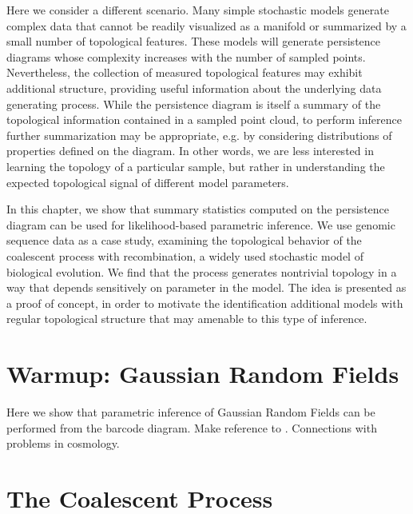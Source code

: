 Here we consider a different scenario.
Many simple stochastic models generate complex data that cannot be readily visualized as a manifold or summarized by a small number of topological features.
These models will generate persistence diagrams whose complexity increases with the number of sampled points.
Nevertheless, the collection of measured topological features may exhibit additional structure, providing useful information about the underlying data generating process.
While the persistence diagram is itself a summary of the topological information contained in a sampled point cloud, to perform inference further summarization may be appropriate, e.g. by considering distributions of properties defined on the diagram.
In other words, we are less interested in learning the topology of a particular sample, but rather in understanding the expected topological signal of different model parameters.

In this chapter, we show that summary statistics computed on the persistence diagram can be used for likelihood-based parametric inference.
We use genomic sequence data as a case study, examining the topological behavior of the coalescent process with recombination, a widely used stochastic model of biological evolution.
We find that the process generates nontrivial topology in a way that depends sensitively on parameter in the model.
The idea is presented as a proof of concept, in order to motivate the identification additional models with regular topological structure that may amenable to this type of inference.

\section{Warmup: Gaussian Random Fields}

Here we show that parametric inference of Gaussian Random Fields can be performed from the barcode diagram.
Make reference to \cite{Adler:2010}.
Connections with problems in cosmology.

\section{The Coalescent Process}


